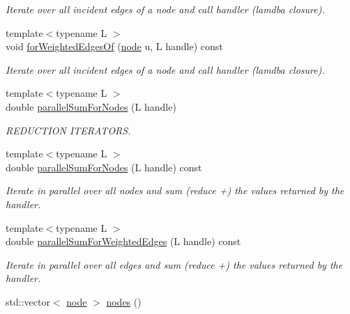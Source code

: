 \begin{DoxyCompactItemize}
\begin{DoxyCompactList}\small\item\em Iterate over all incident edges of a node and call handler (lamdba closure). \end{DoxyCompactList}\item 
{\footnotesize template$<$typename L $>$ }\\void \hyperlink{class_networ_kit_1_1_graph_a7def131befb3c0fc285f4774b5c9d634}{for\-Weighted\-Edges\-Of} (\hyperlink{namespace_networ_kit_a53fe3e4fd04ea024160e4d024dfebadf}{node} u, L handle) const 
\begin{DoxyCompactList}\small\item\em Iterate over all incident edges of a node and call handler (lamdba closure). \end{DoxyCompactList}\item 
{\footnotesize template$<$typename L $>$ }\\double \hyperlink{class_networ_kit_1_1_graph_ac560336001e128a096de4216358c2d18}{parallel\-Sum\-For\-Nodes} (L handle)
\begin{DoxyCompactList}\small\item\em R\-E\-D\-U\-C\-T\-I\-O\-N I\-T\-E\-R\-A\-T\-O\-R\-S. \end{DoxyCompactList}\item 
{\footnotesize template$<$typename L $>$ }\\double \hyperlink{class_networ_kit_1_1_graph_a2e47802411f7f364714dd55dcac9ac32}{parallel\-Sum\-For\-Nodes} (L handle) const 
\begin{DoxyCompactList}\small\item\em Iterate in parallel over all nodes and sum (reduce +) the values returned by the handler. \end{DoxyCompactList}\item 
{\footnotesize template$<$typename L $>$ }\\double \hyperlink{class_networ_kit_1_1_graph_afbd8f19c80d8ec46a68939566383e038}{parallel\-Sum\-For\-Weighted\-Edges} (L handle) const 
\begin{DoxyCompactList}\small\item\em Iterate in parallel over all edges and sum (reduce +) the values returned by the handler. \end{DoxyCompactList}\item 
std\-::vector$<$ \hyperlink{namespace_networ_kit_a53fe3e4fd04ea024160e4d024dfebadf}{node} $>$ \hyperlink{class_networ_kit_1_1_graph_afa414cbe5d6644ffdd317e07191c291d}{nodes} ()

\end{DoxyCompactItemize}
